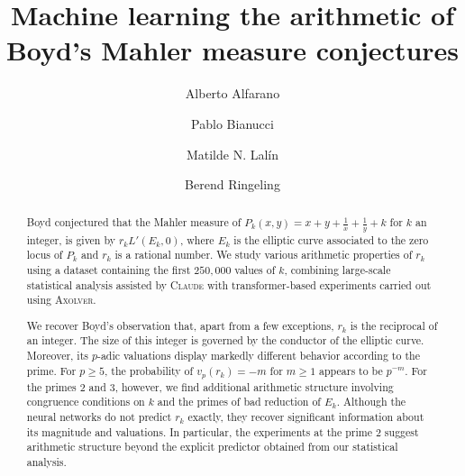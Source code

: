 \documentclass[12pt]{amsart}%
\newcommand{\1}{\mathds{1}}
\theoremstyle{definition}
\numberwithin{equation}{section}
\numberwithin{table}{section}
\numberwithin{figure}{section}
\begin{document}
\raggedbottom%

\title{Machine learning the arithmetic of Boyd's Mahler measure conjectures}
\author{Alberto Alfarano}
\author{Pablo Bianucci}

\author{Matilde N. Lal\'in}
\author{Berend Ringeling}


\address{Alberto Alfarano: Axiom Math}

\address{Pablo Bianucci:  Department of Physics, Concordia University, 7141 Sherbrooke St. W.
Montreal, QC  H4B 1R6, Canada} 


\address{Matilde Lal\'in:  D\'epartement de math\'ematiques et de statistique, Universit\'e de Montr\'eal. CP 6128, succ. Centre-ville. Montreal, QC H3C 3J7, Canada}
\address{Berend Ringeling:  D\'epartement de math\'ematiques et de statistique, Universit\'e de Montr\'eal. CP 6128, succ. Centre-ville. Montreal, QC H3C 3J7, Canada}

\begin{abstract}
Boyd conjectured that the Mahler measure of $P_k(x,y)=x+y+\frac{1}{x}+\frac{1}{y}+k$ for $k$ an integer, is given by $r_kL'(E_k,0)$, where $E_k$ is the elliptic curve associated to the zero locus of $P_k$ and $r_k$ is a rational number. We study various arithmetic properties of $r_k$ using a dataset containing the first $250{,}000$ values of $k$, combining
large-scale statistical analysis assisted by \textsc{Claude} with transformer-based
experiments carried out using \textsc{Axolver}.

We recover Boyd's observation that, apart from a few exceptions, $r_k$ is
the reciprocal of an integer. The size of this integer is governed by the conductor of the elliptic curve. Moreover, its $p$-adic valuations display markedly different behavior according
to the prime. For $p\geq 5$, the probability of
$v_p(r_k)=-m$
for $m\geq 1$ appears to be $p^{-m}$. For the primes  $2$ and $3$, however, we find additional arithmetic structure
involving congruence conditions on $k$ and the primes of bad reduction of
$E_k$. Although the neural networks do not predict $r_k$ exactly, they recover significant information about its magnitude and valuations. In particular, the experiments at the prime $2$ suggest arithmetic structure beyond the explicit predictor obtained from our statistical analysis.


\end{abstract}

\maketitle
\end{document}
